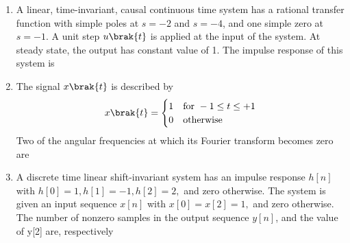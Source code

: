 \documentclass[a4paper, 11pt]{article}
\begin{document}
\begin{enumerate}
    \hfill{}
    
    \item A linear, time-invariant, causal continuous time system has a rational transfer function with simple poles at $s=-2$ and $s=-4$, and one simple zero at $s=-1$. A unit step $u\brak{t}$ is applied at the input of the system. At steady state, the output has constant value of 1. The impulse response of this system is
    
    \begin{enumerate}
    \end{enumerate}
    
    \hfill{}
    
    \item The signal $x\brak{t}$ is described by
    \[ x\brak{t} = \begin{cases} 1 & \text{for } -1 \le t \le +1 \\ 0 & \text{otherwise} \end{cases} \]
    Two of the angular frequencies at which its Fourier transform becomes zero are
    
    \begin{enumerate}
    \end{enumerate}
    
    \hfill{}
    
    \item A discrete time linear shift-invariant system has an impulse response $h[n]$ with $h[0]=1, h[1]=-1, h[2]=2,$ and zero otherwise. The system is given an input sequence $x[n]$ with $x[0]=x[2]=1,$ and zero otherwise. The number of nonzero samples in the output sequence $y[n]$, and the value of y[2] are, respectively
    

\end{enumerate}
\end{document}
